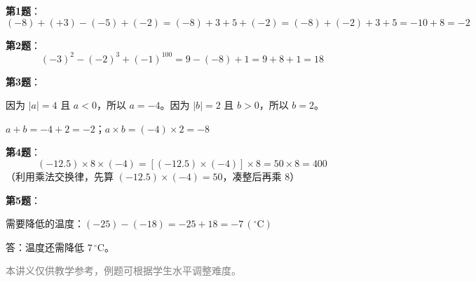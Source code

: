 \documentclass[12pt, a4paper]{ctexart}
\begin{document}
\vspace{10pt}

\begin{knowledgebox}[参考答案]
\textbf{第1题}：
\[
(-8) + (+3) - (-5) + (-2) = (-8) + 3 + 5 + (-2) = (-8) + (-2) + 3 + 5 = -10 + 8 = -2
\]

\textbf{第2题}：
\[
(-3)^2 - (-2)^3 + (-1)^{100} = 9 - (-8) + 1 = 9 + 8 + 1 = 18
\]

\textbf{第3题}：

因为 $|a|=4$ 且 $a<0$，所以 $a = -4$。因为 $|b|=2$ 且 $b>0$，所以 $b = 2$。

$a + b = -4 + 2 = -2$；$a \times b = (-4) \times 2 = -8$

\textbf{第4题}：
\[
(-12.5) \times 8 \times (-4) = [(-12.5) \times (-4)] \times 8 = 50 \times 8 = 400
\]
（利用乘法交换律，先算 $(-12.5) \times (-4) = 50$，凑整后再乘 $8$）

\textbf{第5题}：

需要降低的温度：$(-25) - (-18) = -25 + 18 = -7\,(^\circ\mathrm{C})$

答：温度还需降低 $7\,^\circ\mathrm{C}$。
\end{knowledgebox}

\vfill
\begin{center}
\small\textcolor{gray}{本讲义仅供教学参考，例题可根据学生水平调整难度。}
\end{center}
\end{document}

